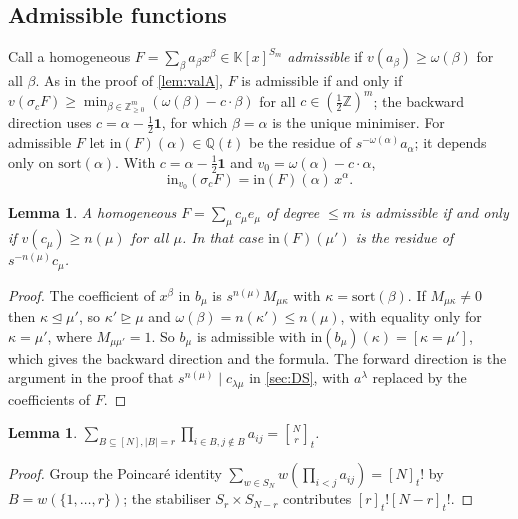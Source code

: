 \documentclass[11pt]{amsart}
\newtheorem{lemma}[theorem]{Lemma}
\theoremstyle{definition}
\theoremstyle{remark}
\numberwithin{equation}{section}
\newcommand{\qbin}[2]{\genfrac{[}{]}{0pt}{}{#1}{#2}_t}
\begin{document}
\subsection{Admissible functions}
Call a homogeneous $F=\sum_\beta a_\beta x^\beta\in\mathbb{K}[x]^{S_m}$ \emph{admissible} if $v(a_\beta)\ge\omega(\beta)$ for all $\beta$. As in the proof of \cref{lem:valA}, $F$ is admissible if and only if $v(\sigma_cF)\ge\min_{\beta\in\mathbb{Z}^m_{\ge0}}(\omega(\beta)-c\cdot\beta)$ for all $c\in(\frac12\mathbb{Z})^m$; the backward direction uses $c=\alpha-\frac12\mathbf1$, for which $\beta=\alpha$ is the unique minimiser. For admissible $F$ let $\mathrm{in}(F)(\alpha)\in\mathbb{Q}(t)$ be the residue of $s^{-\omega(\alpha)}a_\alpha$; it depends only on $\mathrm{sort}(\alpha)$. With $c=\alpha-\frac12\mathbf1$ and $v_0=\omega(\alpha)-c\cdot\alpha$,
\begin{equation}\label{eq:inform}
\mathrm{in}_{v_0}(\sigma_cF)=\mathrm{in}(F)(\alpha)\,x^\alpha .
\end{equation}

\begin{lemma}\label{lem:admissible}
A homogeneous $F=\sum_\mu c_\mu e_\mu$ of degree $\le m$ is admissible if and only if $v(c_\mu)\ge n(\mu)$ for all $\mu$. In that case $\mathrm{in}(F)(\mu')$ is the residue of $s^{-n(\mu)}c_\mu$.
\end{lemma}
\begin{proof}
The coefficient of $x^\beta$ in $b_\mu$ is $s^{n(\mu)}M_{\mu\kappa}$ with $\kappa=\mathrm{sort}(\beta)$. If $M_{\mu\kappa}\ne0$ then $\kappa\trianglelefteq\mu'$, so $\kappa'\trianglerighteq\mu$ and $\omega(\beta)=n(\kappa')\le n(\mu)$, with equality only for $\kappa=\mu'$, where $M_{\mu\mu'}=1$. So $b_\mu$ is admissible with $\mathrm{in}(b_\mu)(\kappa)=[\kappa=\mu']$, which gives the backward direction and the formula. The forward direction is the argument in the proof that $s^{n(\mu)}\mid c_{\lambda\mu}$ in \cref{sec:DS}, with $a^\lambda$ replaced by the coefficients of $F$.
\end{proof}

\begin{lemma}\label{lem:levelset}
$\sum_{B\subseteq[N],|B|=r}\prod_{i\in B,j\notin B}a_{ij}=\qbin Nr$.
\end{lemma}
\begin{proof}
Group the Poincar\'e identity $\sum_{w\in S_N}w(\prod_{i<j}a_{ij})=[N]_t!$ \cite[III (1.4)]{Macdonald95} by $B=w(\{1,\dots,r\})$; the stabiliser $S_r\times S_{N-r}$ contributes $[r]_t![N-r]_t!$.
\end{proof}
\end{document}
